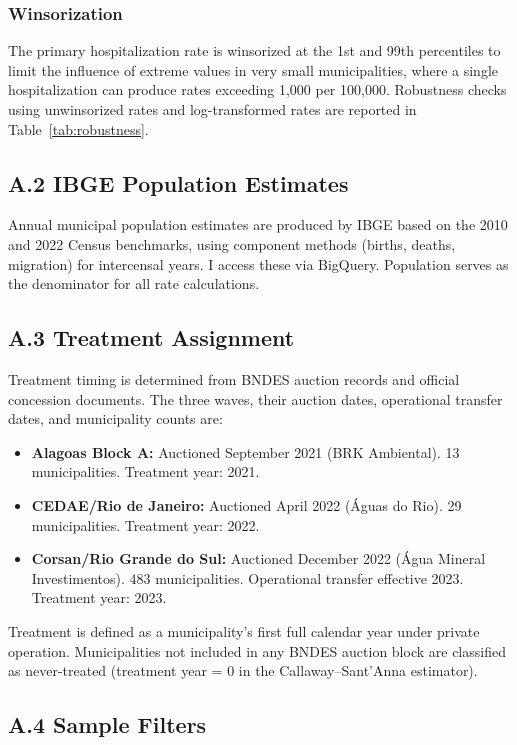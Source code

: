 \documentclass[12pt]{article}
\begin{document}
\subsubsection*{Winsorization} The primary hospitalization rate is winsorized at the 1st and 99th percentiles to limit the influence of extreme values in very small municipalities, where a single hospitalization can produce rates exceeding 1,000 per 100,000. Robustness checks using unwinsorized rates and log-transformed rates are reported in Table~\ref{tab:robustness}.

\subsection*{A.2 IBGE Population Estimates}

Annual municipal population estimates are produced by IBGE based on the 2010 and 2022 Census benchmarks, using component methods (births, deaths, migration) for intercensal years. I access these via BigQuery. Population serves as the denominator for all rate calculations.

\subsection*{A.3 Treatment Assignment}

Treatment timing is determined from BNDES auction records and official concession documents. The three waves, their auction dates, operational transfer dates, and municipality counts are:

\begin{itemize}
\item \textbf{Alagoas Block A:} Auctioned September 2021 (BRK Ambiental). 13 municipalities. Treatment year: 2021.
\item \textbf{CEDAE/Rio de Janeiro:} Auctioned April 2022 (\'{A}guas do Rio). 29 municipalities. Treatment year: 2022.
\item \textbf{Corsan/Rio Grande do Sul:} Auctioned December 2022 (\'{A}gua Mineral Investimentos). 483 municipalities. Operational transfer effective 2023. Treatment year: 2023.
\end{itemize}

Treatment is defined as a municipality's first full calendar year under private operation. Municipalities not included in any BNDES auction block are classified as never-treated (treatment year = 0 in the Callaway--Sant'Anna estimator).

\subsection*{A.4 Sample Filters}
\end{document}
